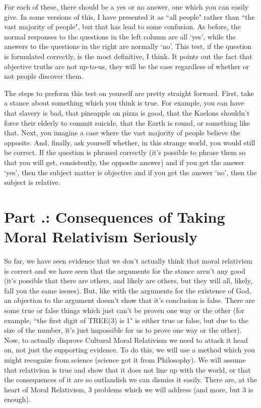 For each of these, there should be a yes or no answer, one which you can easily give. In some versions of this, I have presented it as ``all people" rather than ``the vast majority of people", but that has lead to some confusion. As before, the normal responses to the questions in the left column are all `yes', while the answers to the questions in the right are normally `no'. This test, if the question is formulated correctly, is the most definitive, I think. It points out the fact that objective truths are not up-to-us, they will be the case regardless of whether or not people discover them. 

The steps to preform this test on yourself are pretty straight forward. First, take a stance about something which you think is true. For example, you can have that slavery is bad, that pineapple on pizza is good, that the Kaelons shouldn't force their elderly to commit suicide, that the Earth is round, or something like that. Next, you imagine a case where the vast majority of people believe the opposite. And, finally, ask yourself whether, in this strange world, you would still be correct.  If the question is phrased correctly (it's possible to phrase them so that you will get, consistently, the opposite answer) and if you get the answer `yes', then the subject matter is objective and if you get the answer `no', then the subject is relative.

\section{Part \thechapcount.\theseccount: Consequences of Taking Moral Relativism Seriously}

So far, we have seen evidence that we don't actually think that moral relativism is correct and we have seen that the arguments for the stance aren't any good (it's possible that there are others, and likely are others, but they will all, likely, fall you the same issues). But, like with the arguments for the existence of God, an objection to the argument doesn't show that it's conclusion is false. There are some true or false things which just can't be proven one way or the other (for example, ``the first digit of TREE(3) is 1" is either true or  false, but due to the size of the number, it's just impossible for us to prove one way or the other). Now, to actually disprove Cultural Moral Relativism we need to attack it head on, not just the supporting evidence. To do this, we will use a method which you might recognize from science (science got it from Philosophy). We will assume that relativism is true and show that it does not line up with the world, or that the consequences of it are so outlandish we can dismiss it easily. There are, at the heart of Moral Relativism, 3 problems which we will address (and more, but 3 is enough). 


